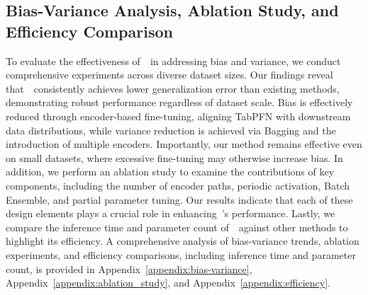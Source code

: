 \subsection{Bias-Variance Analysis, Ablation Study, and Efficiency Comparison}

To evaluate the effectiveness of~\name~in addressing bias and variance, we conduct comprehensive experiments across diverse dataset sizes. Our findings reveal that~\name~consistently achieves lower generalization error than existing methods, demonstrating robust performance regardless of dataset scale. Bias is effectively reduced through encoder-based fine-tuning, aligning TabPFN with downstream data distributions, while variance reduction is achieved via Bagging and the introduction of multiple encoders. Importantly, our method remains effective even on small datasets, where excessive fine-tuning may otherwise increase bias.
In addition, we perform an ablation study to examine the contributions of key components, including the number of encoder paths, periodic activation, Batch Ensemble, and partial parameter tuning. Our results indicate that each of these design elements plays a crucial role in enhancing~\name’s performance. %
Lastly, we compare the inference time and parameter count of~\name~against other methods to highlight its efficiency. A comprehensive analysis of bias-variance trends, ablation experiments, and efficiency comparisons, including inference time and parameter count, is provided in Appendix~\ref{appendix:bias-variance}, Appendix~\ref{appendix:ablation_study}, and Appendix~\ref{appendix:efficiency}.



